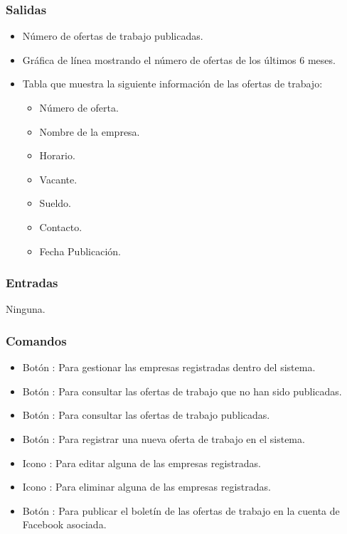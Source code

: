 \pagebreak
{}

\subsubsection{Salidas}
\begin{itemize}
	\item Número de ofertas de trabajo publicadas.
	\item Gráfica de línea mostrando el número de ofertas de los últimos 6 meses.
	\item Tabla que muestra la siguiente información de las ofertas de trabajo:
	\begin{itemize}
 		\item Número de oferta.
		\item Nombre de la empresa.
		\item Horario.
		\item Vacante.
		\item Sueldo.
		\item Contacto.
		\item Fecha Publicación.
	\end{itemize}	
\end{itemize}

\subsubsection{Entradas}
	\noindent
	Ninguna.

\subsubsection{Comandos}
	\begin{itemize}
		\item Botón : Para gestionar las empresas registradas dentro del sistema.
		\item Botón : Para consultar las ofertas de trabajo que no han sido publicadas.
		\item Botón : Para consultar las ofertas de trabajo publicadas.
		\item Botón : Para registrar una nueva oferta de trabajo en el sistema.  
		\item Icono : Para editar alguna de las empresas registradas.
		\item Icono : Para eliminar alguna de las empresas registradas.
		\item Botón : Para publicar el boletín de las ofertas de trabajo en la cuenta de Facebook asociada.
	\end{itemize}


